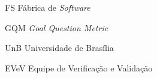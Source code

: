 \begin{siglas}
  \item[FS] Fábrica de \textit{Software}
  \item[GQM] \textit{Goal Question Metric}
  \item[UnB] Universidade de Brasília
  \item[EVeV] Equipe de Verificação e Validação
\end{siglas}
